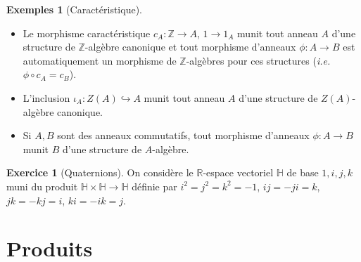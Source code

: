 \documentclass[a4paper, oneside, 12pt]{book}
\theoremstyle{theoremeStyle} %
\theoremstyle{definition} %
\newtheorem{exemples}[theoreme]{Exemples}
\newtheorem{exercice}[theoreme]{Exercice}
\newcommand{\ie}{\textit{i.e.}} %
\DeclareMathOperator{\Id}{Id}
\newcommand{\CC}{\mathbb{C}}
\newcommand{\Z}{\mathbb{Z}}
\newcommand{\R}{\mathbb{R}}
\newcommand{\HH}{\mathbb{H}}
\begin{document}
	\begin{exemples}[Caractéristique]
\begin{itemize}[leftmargin=* ,parsep=0cm,itemsep=0cm,topsep=0cm]
\item Le morphisme caractéristique $c_A:\Z\rightarrow A$, $1\rightarrow 1_A$ munit tout anneau $A$ d'une structure de $\Z$-algèbre canonique et tout morphisme d'anneaux $\phi:A\rightarrow B$ est automatiquement un morphisme de $\Z$-algèbres pour ces structures (\ie{} $\phi\circ c_A=c_B$).
\item L'inclusion $\iota_A: Z(A)\hookrightarrow  A $  munit tout anneau $A$ d'une structure de $Z(A)$-algèbre canonique.
\item Si $A,B$ sont des anneaux commutatifs, tout morphisme d'anneaux $\phi:A\rightarrow B$ munit $B$ d'une structure de $A$-algèbre.\\
\end{itemize}\end{exemples}

\begin{exercice}[Quaternions] On considère le $\R$-espace vectoriel $\HH$ de base $1,i,j,k$ muni du produit $\HH\times \HH\rightarrow \HH$ définie par $i^2=j^2=k^2=-1$, $ij=-ji=k$, $jk=-kj=i$, $ki=-ik=j$.
\end{exercice}


\section{Produits}
\end{document}
